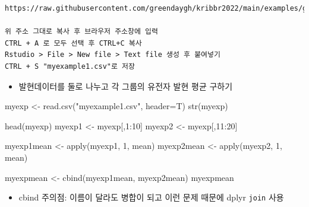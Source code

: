 \documentclass[
]{book}
\newenvironment{Shaded}{\begin{snugshade}}{\end{snugshade}}
\newcommand{\AttributeTok}[1]{\textcolor[rgb]{0.77,0.63,0.00}{#1}}
\newcommand{\DecValTok}[1]{\textcolor[rgb]{0.00,0.00,0.81}{#1}}
\newcommand{\FunctionTok}[1]{\textcolor[rgb]{0.00,0.00,0.00}{#1}}
\newcommand{\NormalTok}[1]{#1}
\newcommand{\OtherTok}[1]{\textcolor[rgb]{0.56,0.35,0.01}{#1}}
\newcommand{\SpecialCharTok}[1]{\textcolor[rgb]{0.00,0.00,0.00}{#1}}
\newcommand{\StringTok}[1]{\textcolor[rgb]{0.31,0.60,0.02}{#1}}
\providecommand{\tightlist}{%
  \setlength{\itemsep}{0pt}\setlength{\parskip}{0pt}}
\begin{document}
\begin{verbatim}
https://raw.githubusercontent.com/greendaygh/kribbr2022/main/examples/gse93819_expression_values.csv

위 주소 그대로 복사 후 브라우저 주소창에 입력
CTRL + A 로 모두 선택 후 CTRL+C 복사 
Rstudio > File > New file > Text file 생성 후 붙여넣기
CTRL + S "myexample1.csv"로 저장 
\end{verbatim}

\begin{itemize}
\tightlist
\item
  발현데이터를 둘로 나누고 각 그룹의 유전자 발현 평균 구하기
\end{itemize}

\begin{Shaded}
\begin{Highlighting}[]

\NormalTok{myexp }\OtherTok{\textless{}{-}} \FunctionTok{read.csv}\NormalTok{(}\StringTok{"myexample1.csv"}\NormalTok{, }\AttributeTok{header=}\NormalTok{T)}
\FunctionTok{str}\NormalTok{(myexp)}

\FunctionTok{head}\NormalTok{(myexp)}
\NormalTok{myexp1 }\OtherTok{\textless{}{-}}\NormalTok{ myexp[,}\DecValTok{1}\SpecialCharTok{:}\DecValTok{10}\NormalTok{]}
\NormalTok{myexp2 }\OtherTok{\textless{}{-}}\NormalTok{ myexp[,}\DecValTok{11}\SpecialCharTok{:}\DecValTok{20}\NormalTok{]}

\NormalTok{myexp1mean }\OtherTok{\textless{}{-}} \FunctionTok{apply}\NormalTok{(myexp1, }\DecValTok{1}\NormalTok{, mean)}
\NormalTok{myexp2mean }\OtherTok{\textless{}{-}} \FunctionTok{apply}\NormalTok{(myexp2, }\DecValTok{1}\NormalTok{, mean)}

\NormalTok{myexpmean }\OtherTok{\textless{}{-}} \FunctionTok{cbind}\NormalTok{(myexp1mean, myexp2mean)}
\NormalTok{myexpmean}
\end{Highlighting}
\end{Shaded}

\begin{itemize}
\tightlist
\item
  cbind 주의점: 이름이 달라도 병합이 되고 이런 문제 때문에 dplyr \texttt{join} 사용
\end{itemize}
\end{document}
